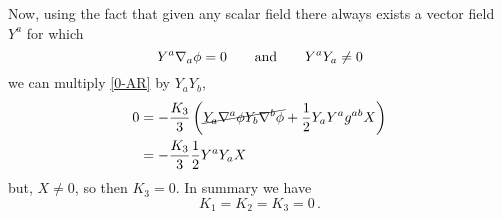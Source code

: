 Now, using the fact that given any scalar field there always exists a vector field $Y^{a}$ for which \cite{Horndeski:1974wa}
\begin{equation}
  Y^{a}\nabla_a\phi =0\qquad \text{and}\qquad Y^{a}Y_a\neq 0
\end{equation}
we can multiply \eqref{0-AR} by $Y_aY_b$,
\begin{align}
  0&=-\frac{K_3}{3}\left(\cancel{Y_a\nabla^{a}\phi Y_b\nabla^b\phi} +\frac{1}{2}Y_aY^{a}g^{ab}X\right) \\
  &=-\frac{K_3}{3}\frac{1}{2}Y^{a}Y_a X
\end{align}
but, $X\neq 0$, so then $K_3=0$. In summary we have
\begin{equation}
  K_1=K_2=K_3=0\,.
\end{equation}



















































